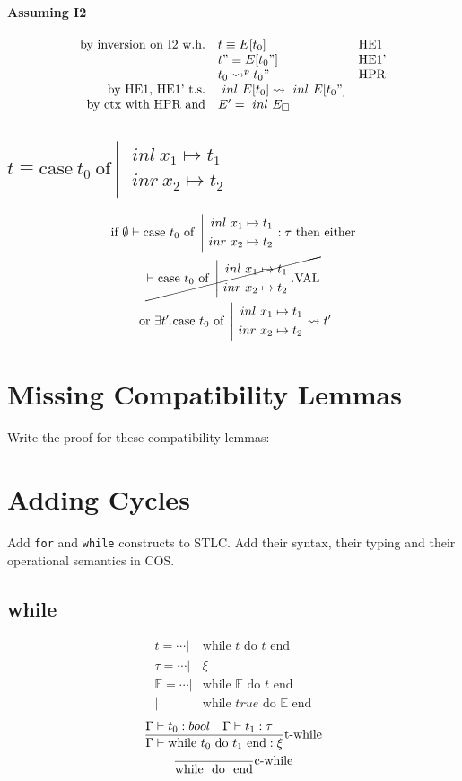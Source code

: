 \documentclass{article}
\newcommand{\st}[3][]{\ensuremath{\displaystyle\frac{#3\hfill}{#2\hfill} \text{#1}}}
\newcommand{\inl}[0]{\ensuremath{\ inl\ }}
\newcommand{\inr}[0]{\ensuremath{\ inr\ }}
\newcommand{\case}[3]{\ensuremath{\text{case}\ #1\ \text{of}\ \left|\begin{aligned}#2\\#3\end{aligned}\right.}}
\newcommand{\while}[2]{\ensuremath{\text{while }#1\text{ do }#2\text{ end}}}
\newcommand{\mE}[0]{\ensuremath{\mathbb{E}}}
\begin{document}
\paragraph{Assuming I2}
\[
    \begin{array}{rl @{\quad} l}
        \text{by inversion on I2 w.h.}   &  t \equiv E[t_0]         & \text{HE1}\\
                                         &  t" \equiv E[t_0"]        & \text{HE1'}\\
                                         &  t_0 \leadsto^p t_0"     & \text{HPR}\\
        \text{by HE1, HE1' t.s.}         &  \inl E[t_0] \leadsto \inl E[t_0"] \\
        \text{by ctx with HPR and}       &  E' = \inl E _\square \\
    \end{array}
\]

\subsection{$t \equiv \case{t_0}{\inl x_1 \mapsto t_1}{\inr x_2 \mapsto t_2}$}
\begin{multline*}
    \text{ if } \emptyset \vdash \case{t_0}{\inl x_1 \mapsto t_1}{\inr x_2 \mapsto t_2}:\tau \text{ then either } \\ \cancel{ \vdash \case{t_0}{\inl x_1 \mapsto t_1}{\inr x_2 \mapsto t_2}.\text{VAL} } \\ \text{ or } \exists t'.\case{t_0}{\inl x_1 \mapsto t_1}{\inr x_2 \mapsto t_2}\leadsto t'
\end{multline*} 

\section{Missing Compatibility Lemmas}
Write the proof for these compatibility lemmas:

\section{Adding Cycles}
Add \texttt{for} and \texttt{while} constructs to STLC. Add their syntax, their typing and their operational
semantics in COS.

\subsection{while}
\begin{align*}
    t = \cdots |& \while{t}{t} \\
    \tau = \cdots |& \xi \\
    \mE = \cdots |& \while{\mE}{t} \\
                 |& \while{true}{\mE}
\end{align*}
\begin{gather*}
    \st[t-while]{\Gamma\vdash \while{t_0}{t_1}: \xi }{\Gamma\vdash t_0:bool \quad \Gamma\vdash t_1:\tau} \\
    \st[c-while]{\while{}{}}{}
\end{gather*}
\end{document}
